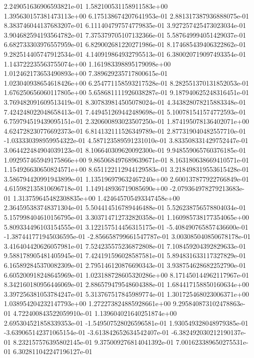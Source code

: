 2.249051636906593821e-01
1.582100531158911583e+00
1.395630157381473113e+00
6.175138674207641953e-01
2.881317387936888075e-01
8.383746044137683207e-01
6.111404797574779835e-01
3.927257425473023034e-01
3.904682594193564782e-01
7.375379705107132366e-01
5.587649994051429037e-01
6.682733303976557959e-01
6.829002681220271986e-01
8.174685439406322862e-01
9.282514405747912534e-01
4.140919864932795513e-01
6.380020719097493354e-01
1.143722235563755074e+00
1.161983398895179098e+00
1.012462173653490893e+00
7.389629235717800615e-01
1.023040938654618426e+00
6.254771158593217528e-01
8.282551370131852053e-01
1.676250656060117805e+00
5.658681111926038287e-01
9.187940625248316451e-01
3.769482091609513419e-01
8.307839814505078024e-01
4.343828078215883348e-01
7.424248022048658413e-01
7.449451269442489698e-01
5.100781541574772593e-01
6.759794519439095151e-01
2.320600893023507250e-01
1.874195078136402071e+00
4.624728230776692373e-01
6.814132111526349789e-01
2.877319040482557710e-01
-1.033330398959954322e-01
4.587123589591231010e-01
3.833508331429752447e-01
3.064422484904039123e-01
8.106640309620092300e-01
9.948559065760376185e-01
1.092957465949175866e+00
9.865068497689639671e-01
8.163180638669410571e-01
1.154926630650824571e+00
8.651122112944129583e-01
3.218498319553615428e-01
3.586794420991943899e-01
1.135196979632467240e+00
2.600137877922766849e-01
4.615982135810696718e-01
1.149148936719085690e+00
-2.079364978279213683e-01
1.313759645482308835e+00
1.424645705493347458e+00
2.364595383748371304e-01
5.504414516789446488e-01
5.526238756578804034e-01
5.157998404610156795e-01
3.303714712732820358e-01
1.160985738177354065e+00
5.809334496103154555e-01
3.122157514456315175e-01
-5.408490765857436600e-01
-1.387441771945036595e-01
-2.856658799661547787e-01
3.003085040850678178e-01
3.416404420626057981e-01
7.524235575236872808e-01
7.108459204392829633e-01
9.588178905481405945e-01
7.424191596028587581e-01
5.894831633117327829e-01
6.165892845370082309e-01
2.795146120876690343e-01
3.938754628682252790e-01
6.605200918248645969e-01
1.023188728605320286e+00
8.171450144962117967e-01
8.342160180956446069e-01
2.886579479548604388e-01
1.684417158850160634e+00
3.397256381053784247e-01
5.313767517845989774e-01
1.301725468023006371e+00
1.038954204232147793e+00
1.272273824885928661e+00
9.295840873102478863e-01
4.722400843522059910e-01
1.139604021640251874e+00
2.695304521858339353e-01
-1.549507528026596581e-01
1.930549328048979385e-01
-3.639065142371065154e-01
-3.613842652634542407e-01
-6.382492030212190137e-01
8.232157576395802145e-01
9.375009276814041392e-01
7.001623389650275531e-01
6.302811042247196127e-01
